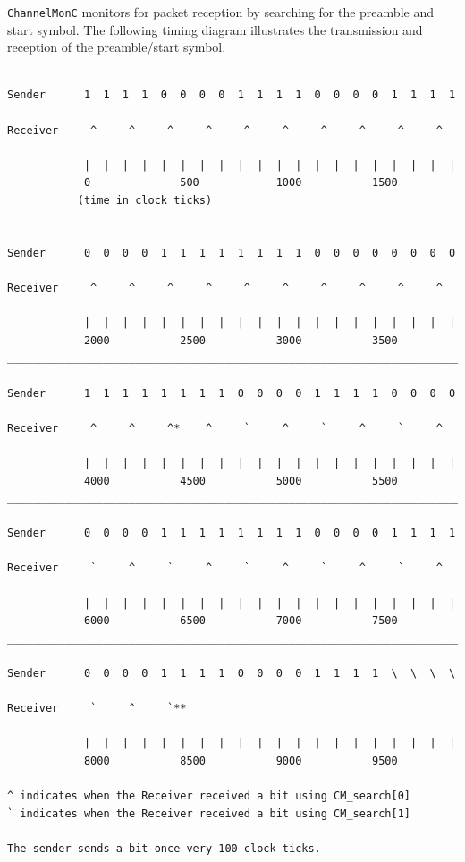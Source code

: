 \documentclass[11pt]{article}
\begin{document}
{\tt ChannelMonC} monitors for packet reception by searching for the preamble and
start symbol. The following timing diagram illustrates the
transmission and reception of the preamble/start symbol.
\newpage
\small
\begin{verbatim}

Sender      1  1  1  1  0  0  0  0  1  1  1  1  0  0  0  0  1  1  1  1

Receiver     ^     ^     ^     ^     ^     ^     ^     ^     ^     ^            

            |  |  |  |  |  |  |  |  |  |  |  |  |  |  |  |  |  |  |  |   
            0              500            1000           1500
           (time in clock ticks)
__________________________________________________________________________

Sender      0  0  0  0  1  1  1  1  1  1  1  1  0  0  0  0  0  0  0  0

Receiver     ^     ^     ^     ^     ^     ^     ^     ^     ^     ^            

            |  |  |  |  |  |  |  |  |  |  |  |  |  |  |  |  |  |  |  |   
            2000           2500           3000           3500
__________________________________________________________________________

Sender      1  1  1  1  1  1  1  1  0  0  0  0  1  1  1  1  0  0  0  0

Receiver     ^     ^     ^*    ^     `     ^     `     ^     `     ^            

            |  |  |  |  |  |  |  |  |  |  |  |  |  |  |  |  |  |  |  |   
            4000           4500           5000           5500
__________________________________________________________________________

Sender      0  0  0  0  1  1  1  1  1  1  1  1  0  0  0  0  1  1  1  1

Receiver     `     ^     `     ^     `     ^     `     ^     `     ^            

            |  |  |  |  |  |  |  |  |  |  |  |  |  |  |  |  |  |  |  |   
            6000           6500           7000           7500
__________________________________________________________________________

Sender      0  0  0  0  1  1  1  1  0  0  0  0  1  1  1  1  \  \  \  \

Receiver     `     ^     `**   

            |  |  |  |  |  |  |  |  |  |  |  |  |  |  |  |  |  |  |  |   
            8000           8500           9000           9500

^ indicates when the Receiver received a bit using CM_search[0]
` indicates when the Receiver received a bit using CM_search[1]

The sender sends a bit once very 100 clock ticks.

\end{verbatim}
\end{document}
